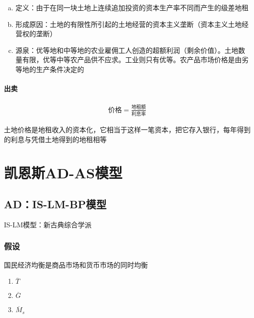 \documentclass[12pt]{book}
\begin{document}
\begin{enumerate}[1.]
\begin{enumerate}[(1)]
\begin{enumerate}[a.]
                        \item 定义：由于在同一块土地上连续追加投资的资本生产率不同而产生的级差地租
                        \item 形成原因：土地的有限性所引起的土地经营的资本主义垄断（资本主义土地经营权的垄断）
                        \item 源泉：优等地和中等地的农业雇佣工人创造的超额利润（剩余价值）。土地数量有限，优等中等农产品供不应求。工业则只有优等。农产品市场价格是由劣等地的生产条件决定的
                    \end{enumerate}
          \end{enumerate}
\end{enumerate}











\subsubsection{出卖}

\begin{gather*}
    \text{价格}=\frac{\text{地租额}}{\text{利息率}}
\end{gather*}


土地价格是地租收入的资本化，它相当于这样一笔资本，把它存入银行，每年得到的利息与凭借土地得到的地租相等











\chapter{凯恩斯AD-AS模型}


\section{AD：IS-LM-BP模型}

IS-LM模型：新古典综合学派



\subsection{假设}
国民经济均衡是商品市场和货币市场的同时均衡

\begin{enumerate}[1.]
    \item $\overline{T}$
    \item $\overline{G}$
    \item $\overline{M}_s$ 
\end{enumerate}
\end{document}
